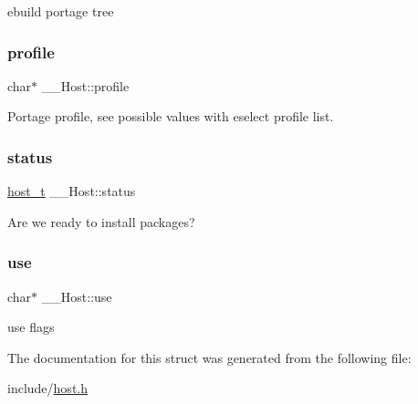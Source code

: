 ebuild portage tree 

\mbox{\label{struct_____host_abfbef38d66410fc8705ea35967e65115}} 
\subsubsection{\texorpdfstring{profile}{profile}}
{\footnotesize\ttfamily char$\ast$ \+\_\+\+\_\+\+Host\+::profile}



Portage profile, see possible values with eselect profile list. 

\mbox{\label{struct_____host_a0a366a15966b166891ba8451009df63d}} 
\subsubsection{\texorpdfstring{status}{status}}
{\footnotesize\ttfamily \mbox{\hyperlink{host_8h_a1392734739c1e1eba62ebfab3bf7dc92}{host\+\_\+t}} \+\_\+\+\_\+\+Host\+::status}



Are we ready to install packages? 

\mbox{\label{struct_____host_a29d2f3a317a102944ed07955038d827c}} 
\subsubsection{\texorpdfstring{use}{use}}
{\footnotesize\ttfamily char$\ast$ \+\_\+\+\_\+\+Host\+::use}



use flags 



The documentation for this struct was generated from the following file\+:\begin{DoxyCompactItemize}
\item 
include/\mbox{\hyperlink{host_8h}{host.\+h}}\end{DoxyCompactItemize}
